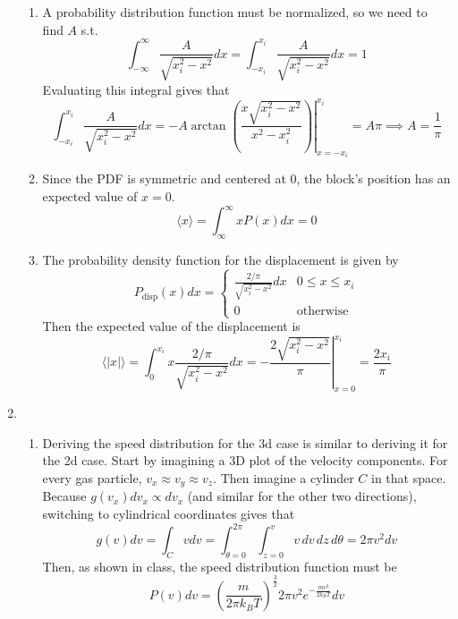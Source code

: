 \documentclass[fleqn]{article}[12pt]
\begin{document}
\begin{enumerate}
\begin{enumerate}
        \item A probability distribution function must be normalized, so we need to find $A$ s.t.
        \begin{equation*}
            \int_{-\infty}^\infty \frac{A}{\sqrt{x_i^2-x^2}}dx = \int_{-x_i}^{x_i} \frac{A}{\sqrt{x_i^2-x^2}}dx = 1
        \end{equation*}
        Evaluating this integral gives that
        \begin{equation*}
            \int_{-x_i}^{x_i} \frac{A}{\sqrt{x_i^2-x^2}}dx = \left. -A \arctan \left(\frac{x \sqrt{x_i^2-x^2}}{x^2-x_i^2}\right)\right|_{x=-x_i}^{x_i} = A \pi \implies A = \frac{1}{\pi}
        \end{equation*}

        \item Since the PDF is symmetric and centered at 0, the block's position has an expected value of $x=0$.
        \begin{equation*}
            \langle x \rangle = \int_{\infty}^{\infty} x P(x) dx = 0
        \end{equation*}

        \item The probability density function for the displacement is given by
        \begin{equation*}
            P_{\text{disp}}(x) dx = \begin{cases}
                \frac{2/\pi}{\sqrt{x_i^2-x^2}}dx & 0\leq x\leq x_i \\
                0 & \text{otherwise}
        \end{cases}
        \end{equation*}
        Then the expected value of the displacement is
        \begin{equation*}
            \langle |x| \rangle = \int_0^{x_i} x \frac{2/\pi}{\sqrt{x_i^2-x^2}}dx = \left. -\frac{2 \sqrt{x_i^2-x^2}}{\pi } \right|_{x=0}^{x_i} = \frac{2x_i}{\pi}
        \end{equation*}
    \end{enumerate}

    \item \begin{enumerate}
        \item Deriving the speed distribution for the 3d case is similar to deriving it for the 2d case. Start by imagining a 3D plot of the velocity components. For every gas particle, $v_x \approx v_y \approx v_z$. Then imagine a cylinder $C$ in that space. Because $g(v_x)dv_x \propto dv_x$ (and similar for the other two directions), switching to cylindrical coordinates gives that
        \begin{equation*}
            g(v)dv = \int_C v dv = \int_{\theta = 0}^{2\pi} \int_{z=0}^{v} v \,dv\, dz\, d\theta = 2 \pi v^2 dv
        \end{equation*}
        Then, as shown in class, the speed distribution function must be
        \begin{equation*}
            P(v) dv = \left(\frac{m}{2\pi k_B T}\right)^{\frac{3}{2}} 2 \pi v^2 e^{-\frac{mv^2}{2k_BT}} dv
        \end{equation*}


\end{enumerate}
\end{enumerate}
\end{document}
